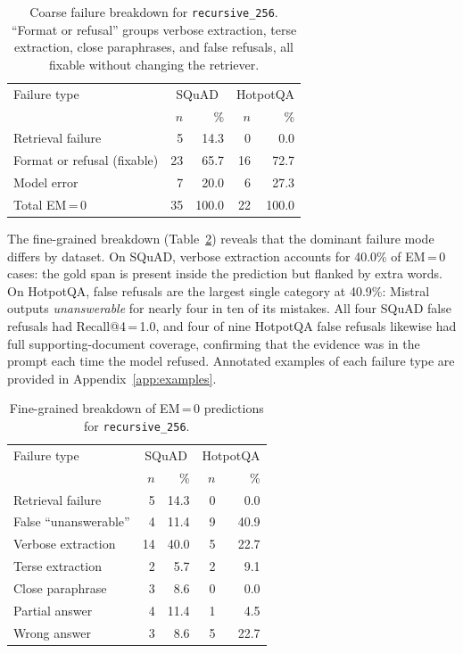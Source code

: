 \documentclass[11pt]{article}
\begin{document}
\begin{table}[h]
\centering
\small
\begin{tabular}{lrrrr}
\toprule
Failure type & \multicolumn{2}{c}{SQuAD} & \multicolumn{2}{c}{HotpotQA} \\
 & $n$ & \% & $n$ & \% \\
\midrule
Retrieval failure           &  5 & 14.3 &  0 &  0.0 \\
Format or refusal (fixable) & 23 & 65.7 & 16 & 72.7 \\
Model error                 &  7 & 20.0 &  6 & 27.3 \\
\midrule
Total EM\,=\,0              & 35 & 100.0 & 22 & 100.0 \\
\bottomrule
\end{tabular}
\caption{Coarse failure breakdown for \texttt{recursive\_256}. ``Format or refusal''
groups verbose extraction, terse extraction, close paraphrases, and false
refusals, all fixable without changing the retriever.}
\label{tab:error-analysis}
\end{table}

The fine-grained breakdown (Table~\ref{tab:error-analysis-fine}) reveals that the
dominant failure mode differs by dataset. On SQuAD, verbose extraction accounts for
40.0\% of EM\,=\,0 cases: the gold span is present inside the prediction but flanked by
extra words. On HotpotQA, false refusals are the largest single category at
40.9\%: Mistral outputs \textit{unanswerable} for nearly four in ten of its mistakes.
All four SQuAD false refusals had Recall@4\,=\,1.0, and four of nine HotpotQA false
refusals likewise had full supporting-document coverage, confirming that the evidence
was in the prompt each time the model refused.
Annotated examples of each failure type are provided in Appendix~\ref{app:examples}.

\begin{table}[h]
\centering
\small
\begin{tabular}{lrrrr}
\toprule
Failure type & \multicolumn{2}{c}{SQuAD} & \multicolumn{2}{c}{HotpotQA} \\
 & $n$ & \% & $n$ & \% \\
\midrule
Retrieval failure         &  5 & 14.3 &  0 &  0.0 \\
False ``unanswerable''    &  4 & 11.4 &  9 & 40.9 \\
Verbose extraction        & 14 & 40.0 &  5 & 22.7 \\
Terse extraction          &  2 &  5.7 &  2 &  9.1 \\
Close paraphrase          &  3 &  8.6 &  0 &  0.0 \\
Partial answer            &  4 & 11.4 &  1 &  4.5 \\
Wrong answer              &  3 &  8.6 &  5 & 22.7 \\
\bottomrule
\end{tabular}
\caption{Fine-grained breakdown of EM\,=\,0 predictions for \texttt{recursive\_256}.}
\label{tab:error-analysis-fine}
\end{table}
\end{document}
